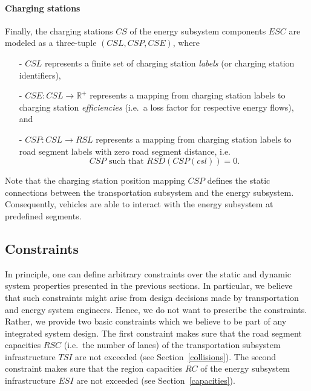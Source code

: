 
\paragraph{Charging stations}
\label{charging_stations}

Finally, the charging stations $CS$ of the energy subsystem components $ESC$ are modeled as a three-tuple $(CSL, CSP, CSE)$, where
\begin{itemize}
	\item[-] $CSL$ represents a finite set of charging station \textit{labels} (or charging station identifiers),
	\item[-] $CSE: CSL \rightarrow \mathbb{R}^+$ represents a mapping from charging station labels to charging station \textit{efficiencies} (i.e.\ a loss factor for respective energy flows), and
	\item[-] $CSP: CSL \rightarrow RSL$ represents a mapping from charging station labels to road segment labels with zero road segment distance, i.e.\
	\[
		CSP \textrm{ such that } RSD(CSP(csl)) = 0 \textrm{.}
	\]
\end{itemize}
Note that the charging station position mapping $CSP$ defines the static connections between the transportation subsystem and the energy subsystem. Consequently, vehicles are able to interact with the energy subsystem at predefined segments.


\subsection{Constraints}
\label{constraints}

In principle, one can define arbitrary constraints over the static and dynamic system properties presented in the previous sections. In particular, we believe that such constraints might arise from design decisions made by transportation and energy system engineers. Hence, we do not want to prescribe the constraints. Rather, we provide two basic constraints which we believe to be part of any integrated system design. The first constraint makes sure that the road segment capacities $RSC$ (i.e.\ the number of lanes) of the transportation subsystem infrastructure $TSI$ are not exceeded (see Section~\ref{collisions}). The second constraint makes sure that the region capacities $RC$ of the energy subsystem infrastructure $ESI$ are not exceeded (see Section~\ref{capacities}).

